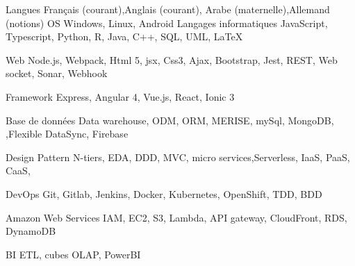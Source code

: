 

\begin{cvskills}
  \cvskill
    {Langues } %
    {Français  (courant),Anglais (courant), Arabe (maternelle),Allemand (notions)} %
  \cvskill
    {OS} %
    {Windows, Linux, Android} %
  \cvskill
    {Langages informatiques} %
    {JavaScript, Typescript, Python, R, Java, C++, SQL, UML, LaTeX} %

  \cvskill
    {Web} %
    {Node.js, Webpack, Html 5, jsx, Css3, Ajax, Bootstrap, Jest, REST, Web socket, Sonar, Webhook} %

  \cvskill
    {Framework} %
    {Express, Angular 4, Vue.js, React, Ionic 3} %

  \cvskill
    {Base de données} %
    {Data warehouse, ODM, ORM, MERISE, mySql, MongoDB, ,Flexible DataSync, Firebase } %

  \cvskill
    {Design Pattern} %
    {N-tiers, EDA, DDD, MVC, micro services,Serverless, IaaS, PaaS, CaaS,  } %

  \cvskill
    {DevOps} %
    {Git, Gitlab, Jenkins, Docker, Kubernetes, OpenShift, TDD, BDD  } %

\cvskill
    {Amazon Web Services} %
    {IAM, EC2, S3, Lambda, API gateway, CloudFront, RDS, DynamoDB } %

\cvskill
    {BI} %
    {ETL, cubes OLAP, PowerBI } %



\end{cvskills}
